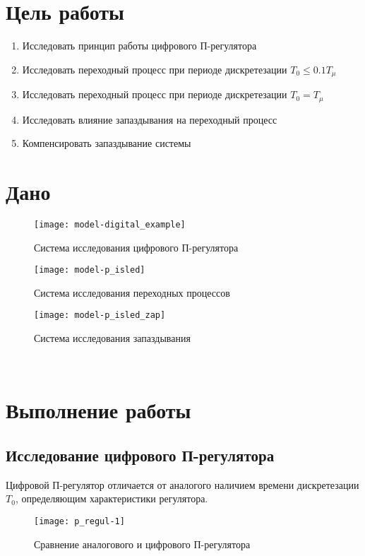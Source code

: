


    


    \section{Цель работы}
    \begin{enumerate}
        \item Исследовать принцип работы цифрового П-регулятора
        \item Исследовать переходный процесс при периоде дискретезации $T_0\leq0.1T_\mu$
        \item Исследовать переходный процесс при периоде дискретезации $T_0=T_\mu$
        \item Исследовать влияние запаздывания на переходный процесс
        \item Компенсировать запаздывание системы
    \end{enumerate}


    \section{Дано}
    \begin{figure}[H]
        \centering\texttt{[image: model-digital\_example]}
        \caption{Система исследования цифрового П-регулятора}
    \end{figure}
    \begin{figure}[H]
        \centering\texttt{[image: model-p\_isled]}
        \caption{Система исследования переходных процессов}
    \end{figure}
    \begin{figure}[H]
        \centering\texttt{[image: model-p\_isled\_zap]}
        \caption{Система исследования запаздывания}
    \end{figure}

    \begin{center}
        \noindent{}\\
    \end{center}


    \section{Выполнение работы}

    \subsection{Исследование цифрового П-регулятора}
    Цифровой П-регулятор отличается от аналогого наличием времени дискретезации $T_0$,
    определяющим характеристики регулятора.
    \begin{figure}[H]
        \centering\texttt{[image: p\_regul-1]}
        \caption{Сравнение аналогового и цифрового П-регулятора}
    \end{figure}

